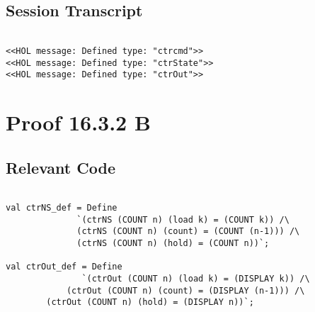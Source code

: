 \documentclass{report}
\begin{document}
\subsection{Session Transcript}
\label{trans4}
\begin{session}
  \begin{scriptsize}
\begin{verbatim}

<<HOL message: Defined type: "ctrcmd">>
<<HOL message: Defined type: "ctrState">>
<<HOL message: Defined type: "ctrOut">>

\end{verbatim}
  \end{scriptsize}
\end{session}

\section{Proof 16.3.2 B}
\label{proof-5}

\subsection{Relevant Code}
\label{rel-code-5}
\begin{lstlisting}[frame=TBlr]

val ctrNS_def = Define
    	      `(ctrNS (COUNT n) (load k) = (COUNT k)) /\
    	      (ctrNS (COUNT n) (count) = (COUNT (n-1))) /\
    	      (ctrNS (COUNT n) (hold) = (COUNT n))`; 

val ctrOut_def = Define
    	       `(ctrOut (COUNT n) (load k) = (DISPLAY k)) /\
 	       	(ctrOut (COUNT n) (count) = (DISPLAY (n-1))) /\
 		(ctrOut (COUNT n) (hold) = (DISPLAY n))`;

\end{lstlisting}
\end{document}
